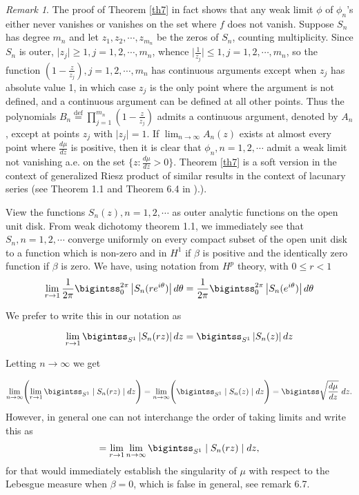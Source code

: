 \documentclass{amsart}
\theoremstyle{definition}
\theoremstyle{remark}
\newtheorem{rem}[Th]{Remark}
\numberwithin{equation}{section}
\newcommand{\egdef}{\stackrel{\textrm {def}}{=}}
\newcommand{\ds}{\displaystyle}
\newcommand{\1}{\mathbb{1}}
\begin{document}
\begin{rem}\label{rem4}\textnormal
The proof of Theorem \ref{th7} in fact shows that any weak limit $\phi$ of $\phi_n$'s  either never vanishes or vanishes on the set where $f$ does not vanish. Suppose $S_n$ has degree $m_n$ and let $z_1, z_2, \cdots, z_{m_n}$ be the zeros of $S_n$, counting multiplicity. Since $S_n$ is outer, $\mid z_j\mid \geq 1, j=1,2,\cdots, m_n$, whence
$\mid \frac{1}{z_j}\mid \leq 1, j =1,2,\cdots, m_n$, so the function $(1 - \frac{z}{z_j}), j =1,2,\cdots, m_n$ has  continuous arguments except when $z_j$ has absolute value 1, in which case $z_j$ is the only point where the
argument is not defined, and a continuous argument can be defined at all other points. Thus the polynomials $ B_n \egdef\prod_{j=1}^{m_n}(1 - \frac{z}{z_j})$ admits a continuous argument, denoted by $A_n$,  except at points $z_j$ with $\mid z_j\mid =1$. If $\lim_{n\rightarrow \infty} A_n(z)$ exists at almost every point where $\frac{d\mu}{dz}$
is positive, then it is clear that $\phi_n, n=1,2,\cdots$ admit a weak limit not vanishing a.e. on the set $\{z: \ds \frac{d\mu}{dz} >0\}$. Theorem \ref{th7}  is a soft version in the context of generalized  Riesz product of similar results in the context of
lacunary series (see Theorem 1.1 and  Theorem 6.4 in \cite[T1, p.202]{Zygmund}).).
\end{rem}
   View the functions $S_n(z), n=1,2,\cdots$ as outer analytic functions on the open unit disk.
From  weak dichotomy theorem 1.1, we immediately see that $S_n, n=1,2,\cdots$ converge uniformly
on every compact subset of the open unit disk to a function which is non-zero and in $H^1$ if $\beta$ is positive and the identically zero function if $\beta$ is zero.
We have, using notation from $H^p$ theory, with $0\leq r <1$
$$\lim_{r\rightarrow 1}\frac{1}{2\pi}\bigintss_0^{2\pi}\left| S_n(re^{i\theta})\right| d\theta = \frac{1}{2\pi}\bigintss_0^{2\pi}\left| S_n(e^{i\theta})\right| d\theta$$

\noindent{}We prefer to write this in our notation as

$$\lim_{r\rightarrow 1}\bigintss_{S^1}\left| S_n(rz)\right| dz = \bigintss_{S^1}\left| S_n(z)\right| dz$$

Letting $n\rightarrow \infty$ we get

$$\lim_{n\rightarrow \infty}\Biggl(\lim_{r\rightarrow 1}\bigintss_{S^1}\mid S_n(rz)\mid dz\Biggr) = \lim_{n\rightarrow \infty}\Biggl(\bigintss_{S^1}\mid S_n(z)\mid dz\Biggr)=\bigintss \sqrt{\frac{d\mu}{dz}}~dz.$$
However, in general one can not  interchange the order of taking limits and write this as
$$=\lim_{r\rightarrow 1}\lim_{n\rightarrow \infty}\bigintss_{S^1}\mid S_n(rz)\mid dz,$$
for that would immediately establish the singularity of $\mu$ with respect to the Lebesgue measure when $\beta =0$, which is false in general, see remark 6.7.
\end{document}
